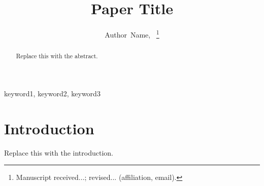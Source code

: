 \documentclass[journal]{IEEEtran}
\title{Paper Title}
\author{
  Author~Name,~\IEEEmembership{Member,~IEEE}
  \thanks{Manuscript received...; revised... (affiliation, email).}%
}
\begin{document}
\maketitle

\begin{abstract}
Replace this with the abstract.
\end{abstract}

\begin{IEEEkeywords}
keyword1, keyword2, keyword3
\end{IEEEkeywords}

\section{Introduction}
Replace this with the introduction.

% 
% 
\end{document}
